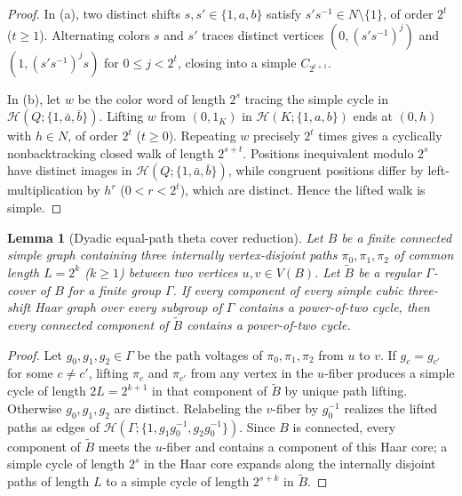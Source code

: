 \documentclass[11pt]{amsart}
\newtheorem{lemma}[theorem]{Lemma}
\theoremstyle{definition}
\theoremstyle{remark}
\newcommand{\Haar}{\mathcal{H}}
\begin{document}
\begin{proof}
In (a), two distinct shifts $s, s' \in \{1,a,b\}$ satisfy $s' s^{-1} \in N \setminus \{1\}$, of order $2^t$ ($t \ge 1$). Alternating colors $s$ and $s'$ traces distinct vertices $(0, (s's^{-1})^j)$ and $(1, (s's^{-1})^j s)$ for $0 \le j < 2^t$, closing into a simple $C_{2^{t+1}}$.

In (b), let $w$ be the color word of length $2^s$ tracing the simple cycle in $\Haar(Q; \{1, \bar{a}, \bar{b}\})$. Lifting $w$ from $(0, 1_K)$ in $\Haar(K; \{1,a,b\})$ ends at $(0, h)$ with $h \in N$, of order $2^t$ ($t \ge 0$). Repeating $w$ precisely $2^t$ times gives a cyclically nonbacktracking closed walk of length $2^{s+t}$. Positions inequivalent modulo $2^s$ have distinct images in $\Haar(Q; \{1,\bar{a},\bar{b}\})$, while congruent positions differ by left-multiplication by $h^r$ ($0 < r < 2^t$), which are distinct. Hence the lifted walk is simple.
\end{proof}

\begin{lemma}[Dyadic equal-path theta cover reduction]\label{lem:theta_reduction}
Let $B$ be a finite connected simple graph containing three internally vertex-disjoint paths $\pi_0, \pi_1, \pi_2$ of common length $L = 2^k$ ($k \ge 1$) between two vertices $u, v \in V(B)$. Let $\widetilde{B}$ be a regular $\Gamma$-cover of $B$ for a finite group $\Gamma$. If every component of every simple cubic three-shift Haar graph over every subgroup of $\Gamma$ contains a power-of-two cycle, then every connected component of $\widetilde{B}$ contains a power-of-two cycle.
\end{lemma}

\begin{proof}
Let $g_0, g_1, g_2 \in \Gamma$ be the path voltages of $\pi_0, \pi_1, \pi_2$ from $u$ to $v$. If $g_c = g_{c'}$ for some $c \ne c'$, lifting $\pi_c$ and $\pi_{c'}$ from any vertex in the $u$-fiber produces a simple cycle of length $2L = 2^{k+1}$ in that component of $\widetilde{B}$ by unique path lifting. Otherwise $g_0, g_1, g_2$ are distinct. Relabeling the $v$-fiber by $g_0^{-1}$ realizes the lifted paths as edges of $\Haar(\Gamma; \{1, g_1 g_0^{-1}, g_2 g_0^{-1}\})$. Since $B$ is connected, every component of $\widetilde{B}$ meets the $u$-fiber and contains a component of this Haar core; a simple cycle of length $2^s$ in the Haar core expands along the internally disjoint paths of length $L$ to a simple cycle of length $2^{s+k}$ in $\widetilde{B}$.
\end{proof}
\end{document}
